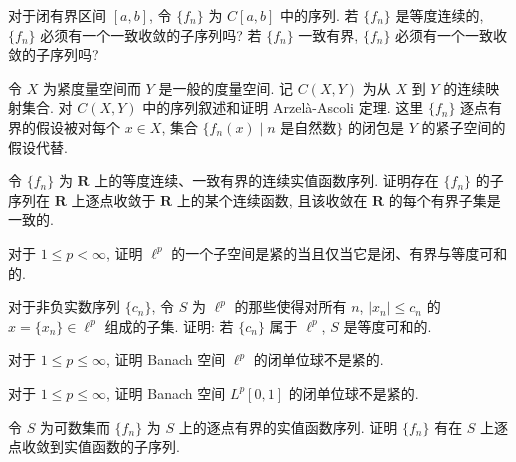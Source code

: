 \documentclass[../../main.tex]{subfiles}
\begin{document}
\begin{exercise}\label{exercise:ch10-07}
对于闭有界区间 $[a,b]$, 令 $\{f_{n}\}$ 为 $C[a,b]$ 中的序列. 若 $\{f_{n}\}$ 是等度连续的, $\{f_{n}\}$ 必须有一个一致收敛的子序列吗? 若 $\{f_{n}\}$ 一致有界, $\{f_{n}\}$ 必须有一个一致收敛的子序列吗?
\end{exercise}

\begin{exercise}\label{exercise:ch10-08}
令 $X$ 为紧度量空间而 $Y$ 是一般的度量空间. 记 $C(X,Y)$ 为从 $X$ 到 $Y$ 的连续映射集合. 对 $C(X,Y)$ 中的序列叙述和证明 Arzel\`a-Ascoli 定理. 这里 $\{f_{n}\}$ 逐点有界的假设被对每个 $x\in X$, 集合 $\{f_{n}(x)\mid n\text{ 是自然数}\}$ 的闭包是 $Y$ 的紧子空间的假设代替.
\end{exercise}

\begin{exercise}\label{exercise:ch10-09}
令 $\{f_{n}\}$ 为 $\mathbf{R}$ 上的等度连续、一致有界的连续实值函数序列. 证明存在 $\{f_{n}\}$ 的子序列在 $\mathbf{R}$ 上逐点收敛于 $\mathbf{R}$ 上的某个连续函数, 且该收敛在 $\mathbf{R}$ 的每个有界子集是一致的.
\end{exercise}

\begin{exercise}\label{exercise:ch10-10}
对于 $1\leqslant p<\infty$, 证明 $\ell^{p}$ 的一个子空间是紧的当且仅当它是闭、有界与等度可和的.
\end{exercise}

\begin{exercise}\label{exercise:ch10-11}
对于非负实数序列 $\{c_{n}\}$, 令 $S$ 为 $\ell^{p}$ 的那些使得对所有 $n$, $|x_{n}|\leqslant c_{n}$ 的 $x=\{x_{n}\}\in\ell^{p}$ 组成的子集. 证明: 若 $\{c_{n}\}$ 属于 $\ell^{p}$, $S$ 是等度可和的.
\end{exercise}

\begin{exercise}\label{exercise:ch10-12}
对于 $1\leqslant p\leqslant\infty$, 证明 Banach 空间 $\ell^{p}$ 的闭单位球不是紧的.
\end{exercise}

\begin{exercise}\label{exercise:ch10-13}
对于 $1\leqslant p\leqslant\infty$, 证明 Banach 空间 $L^{p}[0,1]$ 的闭单位球不是紧的.
\end{exercise}

\begin{exercise}\label{exercise:ch10-14}
令 $S$ 为可数集而 $\{f_{n}\}$ 为 $S$ 上的逐点有界的实值函数序列. 证明 $\{f_{n}\}$ 有在 $S$ 上逐点收敛到实值函数的子序列.
\end{exercise}
\end{document}
